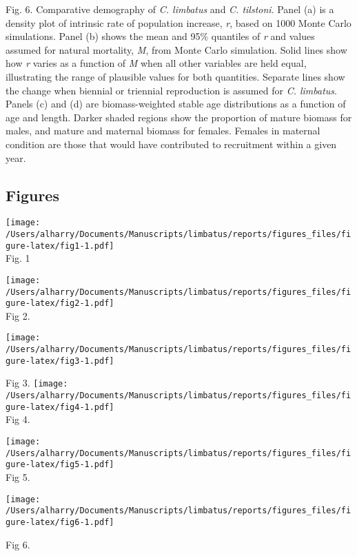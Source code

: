 \documentclass[]{article}
\begin{document}
Fig. 6. Comparative demography of \emph{C. limbatus} and \emph{C.
tilstoni}. Panel (a) is a density plot of intrinsic rate of population
increase, \emph{r}, based on 1000 Monte Carlo simulations. Panel (b)
shows the mean and 95\% quantiles of \emph{r} and values assumed for
natural mortality, \emph{M}, from Monte Carlo simulation. Solid lines
show how \emph{r} varies as a function of \emph{M} when all other
variables are held equal, illustrating the range of plausible values for
both quantities. Separate lines show the change when biennial or
triennial reproduction is assumed for \emph{C. limbatus}. Panels (c) and
(d) are biomass-weighted stable age distributions as a function of age
and length. Darker shaded regions show the proportion of mature biomass
for males, and mature and maternal biomass for females. Females in
maternal condition are those that would have contributed to recruitment
within a given year.

\newpage

\subsection{Figures}\label{figures}

\texttt{[image: /Users/alharry/Documents/Manuscripts/limbatus/reports/figures\_files/figure-latex/fig1-1.pdf]}\\
Fig. 1

\newpage

\texttt{[image: /Users/alharry/Documents/Manuscripts/limbatus/reports/figures\_files/figure-latex/fig2-1.pdf]}\\
Fig 2.

\newpage

\texttt{[image: /Users/alharry/Documents/Manuscripts/limbatus/reports/figures\_files/figure-latex/fig3-1.pdf]}

Fig 3. \newpage
\texttt{[image: /Users/alharry/Documents/Manuscripts/limbatus/reports/figures\_files/figure-latex/fig4-1.pdf]}\\
Fig 4.

\newpage

\texttt{[image: /Users/alharry/Documents/Manuscripts/limbatus/reports/figures\_files/figure-latex/fig5-1.pdf]}\\
Fig 5.

\newpage

\texttt{[image: /Users/alharry/Documents/Manuscripts/limbatus/reports/figures\_files/figure-latex/fig6-1.pdf]}

Fig 6.
\end{document}
